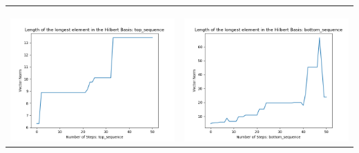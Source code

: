 \documentclass[10pt]{article}
\begin{document}
\begin{tabular}{c|c}
\begin{minipage}{.45\textwidth}
\end{minipage} \\ \\
\hline \\
\begin{minipage}{.45\textwidth}
\includegraphics[width=\textwidth]{"DATA/5d/6 generators 2 bound E alternating/top_sequence LENGTH"}
\end{minipage} &
\begin{minipage}{.45\textwidth}
\includegraphics[width=\textwidth]{"DATA/5d/6 generators 2 bound E alternating/bottom_sequence LENGTH"}
\end{minipage}
\end{tabular}
\end{document}
